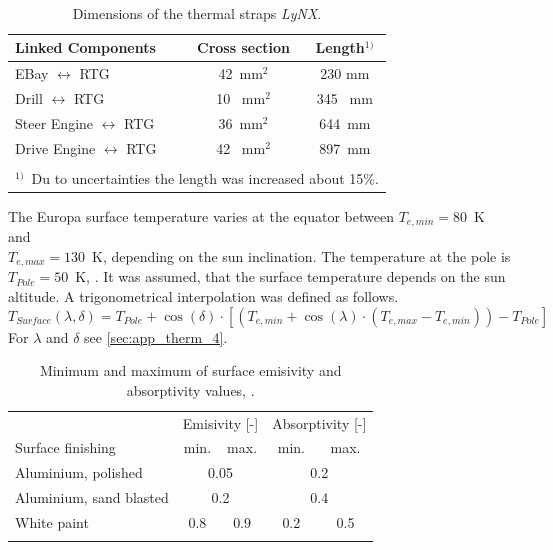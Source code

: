 \begin{table}[H]
	\centering
	\caption{Dimensions of the thermal straps \textit{LyNX}\textsuperscript{\tiny\textregistered}.}
	\begin{tabular}{l@{\quad}cc}
		\hline
		Linked Components & Cross section  & Length$^{1)}$  \\ \hline
		EBay $\leftrightarrow$ RTG & 42\ mm$^2$ & 230 mm  \\[0.25em] 
		Drill $\leftrightarrow$ RTG &10 \ mm$^2$ &345 \ mm \\[0.25em] 
		Steer Engine $\leftrightarrow$ RTG & 36\ mm$^2$&644\ mm  \\[0.25em] 
		Drive Engine $\leftrightarrow$ RTG &42 \ mm$^2$&897\ mm  \\[0.25em] \hline
		& &   \\[-0.5em]
		\multicolumn{3}{l}{$^{1)}$\ Du to uncertainties the length was increased about 15\%.}\\[1em]
	\end{tabular}
	\label{tab:tcs_lynx}
\end{table}

The Europa surface temperature varies at the  equator between $T_{e,min}=80$\ K and\\ $T_{e,max}=130$\ K, depending on the sun inclination.
The temperature at the pole is $T_{Pole}=50$\ K, \cite{Europa}.
It was assumed, that the surface temperature depends on the sun altitude.
A trigonometrical interpolation was defined as follows.
\[ T_{Surface}(\lambda, \delta) = T_{Pole} + \cos (\delta) \cdot [(T_{e,min}+\cos (\lambda)\cdot (T_{e,max}-T_{e,min}))-T_{Pole}] \]
For $\lambda$ and $\delta$ see \autoref{sec:app_therm_4}.\\

\begin{table}[H]
	\centering
	\caption{Minimum and maximum of surface emisivity and absorptivity values, \cite{ref_tcs_05}.}
	\begin{tabular}{l@{\qquad\qquad}cc@{\qquad\qquad}cc}
		\hline
		& \multicolumn{2}{l}{Emisivity [-]} & \multicolumn{2}{l}{Absorptivity [-]}  \\ 
		Surface finishing	&	min. & max. 	&	min. & max.   \\\hline
		Aluminium, polished & \multicolumn{2}{c}{0.05} & \multicolumn{2}{c}{0.2}   \\
		Aluminium, sand blasted & \multicolumn{2}{c}{0.2} & \multicolumn{2}{c}{0.4}   \\
		White paint & 0.8 & 0.9 & 0.2 & 0.5  \\ \hline
		& & & & \\
	\end{tabular}
	\label{tab:tcs_surface}
\end{table}


